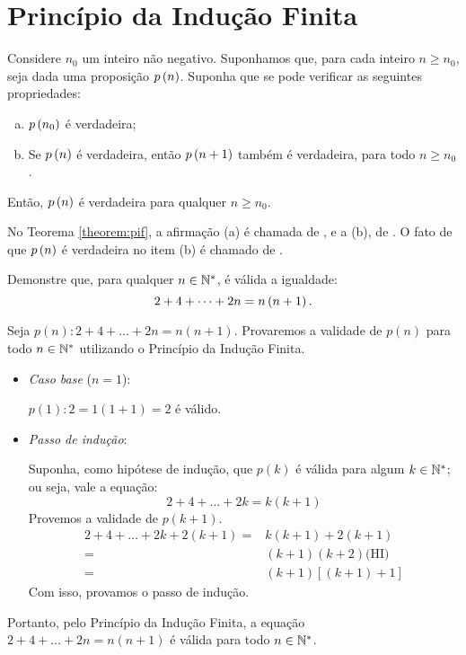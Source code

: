 \section{Princípio da Indução Finita}

\begin{theorem}
\label{theorem:pif}
Considere $n_0$ um inteiro não negativo. Suponhamos que, para cada inteiro $n \geq n_0$, seja dada uma proposição $p \left(n\right)$. Suponha
que se pode verificar as seguintes propriedades:

\begin{enumerate}[(a)]
  \item $p \left(n_0\right)$ é verdadeira;
  \item Se $p \left(n\right)$ é verdadeira, então $p \left(n+1\right)$ também
  é verdadeira, para todo $n \geq n_0$.
\end{enumerate}

\noindent Então, $p \left(n\right)$ é verdadeira para qualquer $n \geq n_0$.
\end{theorem}

\begin{remark}
No Teorema \ref{theorem:pif}, a afirmação (a) é chamada de , e a (b), de . O fato de que $p \left(n\right)$ é verdadeira no item (b) é chamado de .
\end{remark}

\begin{example}
Demonstre que, para qualquer $n \in \mathbb{N}^*$, é válida a igualdade:
%
\begin{equation*}
2+ 4+ \dots + 2n = n \left(n+1\right).
\end{equation*}
\end{example}

\begin{solution}
Seja $p(n) : 2+4+\dots + 2n = n(n+1)$. Provaremos a validade de $p(n)$ para todo $n \in \mathbb{N}^*$ utilizando o Princípio da Indução Finita.
%
\begin{itemize}
	\item \textit{Caso base} ($n=1$):

	$p(1):2=1(1+1)=2$ é válido.

	\item \textit{Passo de indução}:

	Suponha, como hipótese de indução, que $p(k)$ é válida para algum $k \in \mathbb{N}^*$; ou seja, vale a equação:
	\begin{equation*}
	2+4+\dots+2k=k(k+1)
	\end{equation*}
	Provemos a validade de $p(k+1)$.
	\begin{align*}
	2+4+\dots + 2k+2(k+1) = & k(k+1)+2(k+1) \\
	= & (k+1)(k+2) \text{(HI)} \\
	= & (k+1)\left[(k+1)+1\right]
	\end{align*}
	Com isso, provamos o passo de indução.
\end{itemize}
%
Portanto, pelo Princípio da Indução Finita, a equação $2+4+\dots + 2n=n(n+1)$ é válida para todo $n \in \mathbb{N}^*$.
\end{solution}

